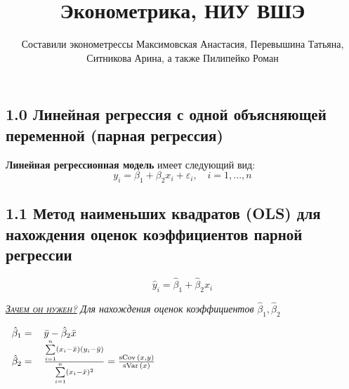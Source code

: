 \documentclass[a0,final]{a0poster}
\title{\textbf{Эконометрика, НИУ ВШЭ}}
\author{Составили эконометрессы Максимовская Анастасия, Перевышина Татьяна, Ситникова Арина, а также Пилипейко Роман}
\DeclareMathOperator{\sVar}{sVar}
\DeclareMathOperator{\sCov}{sCov}
\DeclareMathOperator{\E}{E}
\begin{document}
\begin{minipage}{\textwidth}					%
\maketitle
\end{minipage}
\vspace{1cm}

\begin{multicols}{4}							%
\raggedcolumns							%

\section*{1.0 Линейная регрессия с одной объясняющей переменной (парная регрессия)}
\begin{tcolorbox}[colback=red!5!white,colframe=red!75!black]
\textbf{Линейная регрессионная модель} имеет следующий вид:
\[y_i = \beta_1 +\beta_2x_i + \varepsilon_i, \quad i = 1,...,n\]
\end{tcolorbox}
\subsection*{\textbf{1.1 Метод наименьших квадратов (OLS) для нахождения оценок коэффициентов парной регрессии}}

\[\hat{y}_i=\hat{\beta}_1 +\hat{\beta}_2x_i\]

\underline{\textsc{\textit{Зачем он нужен?}}} \textit{Для нахождения оценок коэффициентов} $\hat{\beta}_1, \hat{\beta}_2$

\begin{center}
\begin{math}
\begin{tabular}{r  l}
$\hat{\beta}_1 =$ & $\bar{y} - \hat{\beta}_2\bar{x}$\\
$\hat{\beta}_2 =$ & $\frac{\sum\limits_{i=1}^n(x_i - \bar{x})(y_i - \bar{y})}{\sum\limits_{i=1}^n(x_i-\bar{x})^2} = \frac{\sCov{(x,y)}}{\sVar{(x)}}$ \\
\end{tabular}
\end{math}
\end{center}


\end{multicols}
\end{document}
